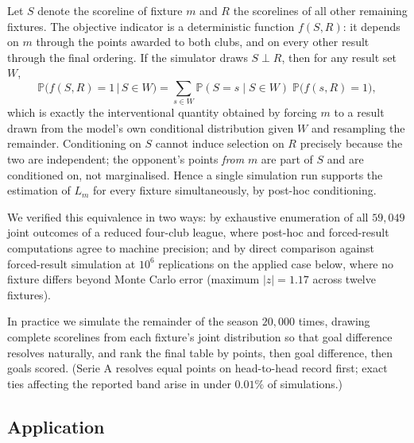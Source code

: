 \documentclass[11pt]{article}
\newcommand{\Prob}{\mathbb{P}}
\begin{document}
Let $S$ denote the scoreline of fixture $m$ and $R$ the scorelines of all other
remaining fixtures. The objective indicator is a deterministic function
$f(S, R)$: it depends on $m$ through the points awarded to both clubs, and on
every other result through the final ordering. If the simulator draws
$S \perp R$, then for any result set $W$,
\begin{equation}
\Prob\big(f(S,R) = 1 \,\big|\, S \in W\big)
= \sum_{s \in W} \Prob(S = s \mid S \in W)\; \Prob\big(f(s, R) = 1\big),
\end{equation}
which is exactly the interventional quantity obtained by forcing $m$ to a result
drawn from the model's own conditional distribution given $W$ and resampling the
remainder. Conditioning on $S$ cannot induce selection on $R$ precisely because
the two are independent; the opponent's points \emph{from} $m$ are part of $S$
and are conditioned on, not marginalised. Hence a single simulation run supports
the estimation of $L_m$ for every fixture simultaneously, by post-hoc
conditioning.

We verified this equivalence in two ways: by exhaustive enumeration of all
$59{,}049$ joint outcomes of a reduced four-club league, where post-hoc and
forced-result computations agree to machine precision; and by direct comparison
against forced-result simulation at $10^{6}$ replications on the applied case
below, where no fixture differs beyond Monte Carlo error (maximum $|z| = 1.17$
across twelve fixtures).

In practice we simulate the remainder of the season $20{,}000$ times, drawing
complete scorelines from each fixture's joint distribution so that goal
difference resolves naturally, and rank the final table by points, then goal
difference, then goals scored. (Serie A resolves equal points on head-to-head
record first; exact ties affecting the reported band arise in under $0.01\%$ of
simulations.)

\subsection{Application}
\end{document}
